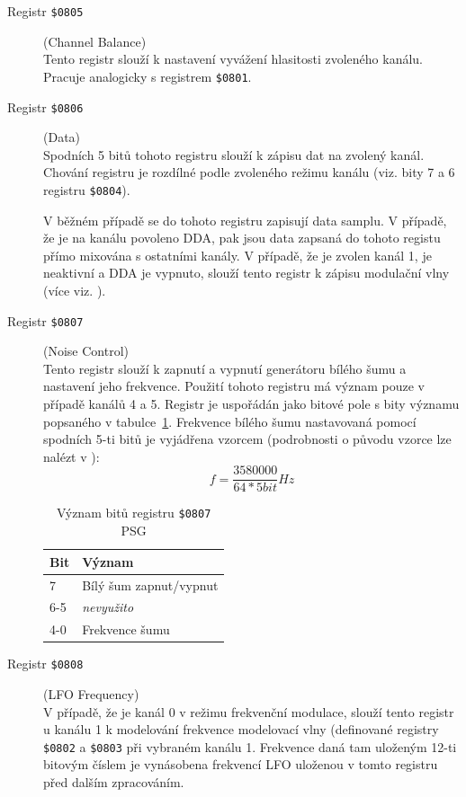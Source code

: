\begin{description}
\item [Registr {\tt \$0805}] (Channel Balance) \\
	Tento registr slouží k nastavení vyvážení hlasitosti zvoleného kanálu.
	Pracuje analogicky s registrem {\tt \$0801}.

\item [Registr {\tt \$0806}] (Data) \\
	Spodních 5 bitů tohoto registru slouží k zápisu dat na zvolený kanál.
	Chování registru je rozdílné podle zvoleného režimu kanálu (viz. bity 7 a 6
	registru {\tt \$0804}).

	V běžném případě se do tohoto registru zapisují data samplu. V případě, že
	je na kanálu povoleno DDA, pak jsou data zapsaná do tohoto registu přímo
	mixována s ostatními kanály. V případě, že je zvolen kanál 1, je neaktivní
	a DDA je vypnuto, slouží tento registr k zápisu modulační vlny (více viz.
	\cite{Clifford}).

\item [Registr {\tt \$0807}] (Noise Control) \\
	Tento registr slouží k zapnutí a vypnutí generátoru bílého šumu a nastavení
	jeho frekvence. Použití tohoto registru má význam pouze v případě kanálů 4
	a 5. Registr je uspořádán jako bitové pole s bity významu popsaného v
	tabulce~\ref{tab:psg_noise}. Frekvence bílého šumu nastavovaná pomocí
	spodních 5-ti bitů je vyjádřena vzorcem (podrobnosti o původu vzorce lze
	nalézt v \cite{Clifford}): $$ f = \frac{3580000}{64 * 5bit} Hz $$

	\begin{table}[ht]
	\begin{center}
	\begin{tabular}{|l|l|}
	\hline
	\textbf{Bit} & \textbf{Význam} \\
	\hline
		7 & Bílý šum zapnut/vypnut \\
		6-5 & {\em nevyužito} \\
		4-0 & Frekvence šumu \\
	\hline
	\end{tabular}
	\end{center}
		\caption{Význam bitů registru {\tt \$0807} PSG\label{tab:psg_noise}}
	\end{table}

\item [Registr {\tt \$0808}] (LFO Frequency) \\
	V případě, že je kanál 0 v režimu frekvenční modulace, slouží tento registr
	u kanálu 1 k modelování frekvence modelovací vlny (definované registry {\tt
	\$0802} a {\tt \$0803} při vybraném kanálu 1. Frekvence daná tam uloženým
	12-ti bitovým číslem je vynásobena frekvencí LFO uloženou v tomto registru
	před dalším zpracováním.


\end{description}
